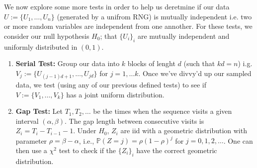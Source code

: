 We now explore some more tests in order to help us deretmine if our data $U := \{U_1, \ldots, U_n\}$ (generated by a unifrom RNG) is mutually independent i.e. two or more random variables are independent from one annother.
For these tests, we consider our null hypothesis $H_0$; that $\{U_i \}_i$ are mutually independent and uniformly distributed in $(0, 1)$.

\begin{enumerate}
    \item \textbf{Serial Test:} Group our data into $k$ blocks of lenght $d$ (such that $kd=n$) i.g. $V_j := \{U_{(j-1)d+1}, \ldots, U_{jd}\}$ for $j=1, \ldots k$.
    Once we've divvy'd up our sampled data, we test (using any of our previous defined tests) to see if $V := \{V_1, \ldots, V_k\}$ has a joint uniform distribution.
    \item \textbf{Gap Test:} Let $T_1, T_2, \dots$ be the times when the sequence visits a given interval $(\alpha, \beta)$. The gap length between consecutive visits is $Z_i = T_i - T_{i-1} - 1$. Under $H_0$, $Z_i$ are iid with a geometric distribution with parameter $\rho = \beta - \alpha$, i.e., $\mathbb{P}(Z=j) = \rho(1-\rho)^j$ for $j=0,1,2,\dots$. 
    One can then use a $\chi^2$ test to check if the $\{Z_i\}_i$ have the correct geometric distribution. 
\end{enumerate}